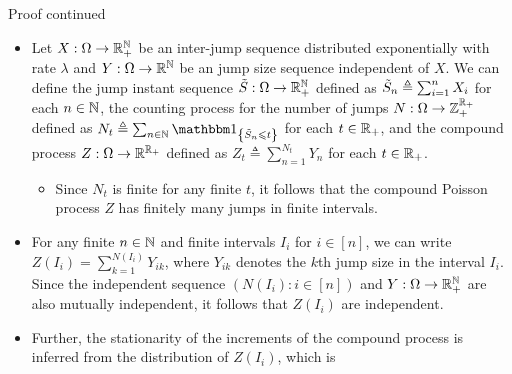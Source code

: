 \documentclass[12pt,aspectratio=169]{beamer}
\begin{document}
\begin{frame}
\begin{block}{Proof continued}
\begin{itemize}
\item[Converse:] Let $X:\Omega\to\mathbb{R}_+^{\mathbb{N}}$ be an \iid inter-jump sequence distributed exponentially with rate $\lambda$ and $Y:\Omega\to\mathbb{R}^{\mathbb{N}}$ be an \iid jump size sequence independent of $X$. 
We can define the jump instant sequence $\tilde{S}:\Omega\to\mathbb{R}_+^{\mathbb{N}}$ defined as $\tilde{S}_n \triangleq \sum_{i=1}^nX_i$ for each $n\in\mathbb{N}$, 
the counting process for the number of jumps $N:\Omega\to\mathbb{Z}_+^{\mathbb{R}_+}$ defined as $N_t \triangleq \sum_{n\in\N}\SetIn{\tS_n \le t}$ for each $t\in\mathbb{R}_+$, 
and the compound process $Z:\Omega\to\mathbb{R}^{\mathbb{R}_+}$  defined as $Z_t \triangleq \sum_{n =1}^{N_t}Y_n$ for each $t\in\mathbb{R}_+$. 
\begin{itemize}
\item[Finitely many jumps:]<1-> Since $N_t$ is finite for any finite $t$, it follows that the compound Poisson process $Z$ has finitely many jumps in finite intervals. 
\end{itemize}
\end{itemize}
\end{block}
\end{frame}

\begin{frame}
\begin{Proof}
\begin{itemize}
\item[Independence of increments:] For any finite $n \in \mathbb{N}$ and finite intervals $I_i$ for $i \in [n]$, 
we can write $Z(I_i)= \sum_{k=1}^{N(I_i)}Y_{ik}$, where $Y_{ik}$ denotes the $k$th jump size in the interval $I_i$. 
Since the independent sequence $(N(I_i): i \in [n])$ and $Y:\Omega\to\mathbb{R}_+^{\mathbb{N}}$ are also mutually independent, 
it follows that $Z(I_i)$ are independent. 
\item[Stationarity of increments:]<2-> Further, the stationarity of the increments of the compound process is inferred from the distribution of $Z(I_i)$, which is 
\end{itemize}
\end{Proof}
\end{frame}
\end{document}
